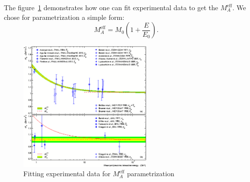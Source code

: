 The figure~\ref{MA_QES_eff} demonstrates how one can fit experimental data to get the $M_{A}^\mathrm{eff}$. We chose for parametrization a simple form:
\begin{equation}
M_{A}^\mathrm{eff}=M_{0}\left(1+\frac{E}{E_{0}}\right).
\end{equation}

\begin{figure}[htb!]
\begin{center}
\includegraphics[width=0.6\textwidth]{./QES/MA_QES_eff.eps}
\caption{\label{MA_QES_eff}Fitting experimental data for $M_{A}^\mathrm{eff}$ parametrization}
\end{center}
\end{figure}

